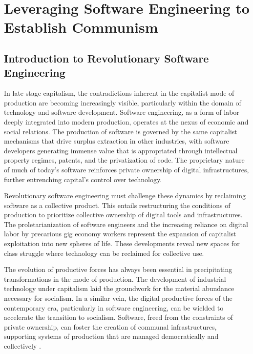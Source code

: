 \chapter{Leveraging Software Engineering to Establish Communism}
\begin{refsection}
    
\section{Introduction to Revolutionary Software Engineering}

In late-stage capitalism, the contradictions inherent in the capitalist mode of production are becoming increasingly visible, particularly within the domain of technology and software development. Software engineering, as a form of labor deeply integrated into modern production, operates at the nexus of economic and social relations. The production of software is governed by the same capitalist mechanisms that drive surplus extraction in other industries, with software developers generating immense value that is appropriated through intellectual property regimes, patents, and the privatization of code. The proprietary nature of much of today's software reinforces private ownership of digital infrastructures, further entrenching capital’s control over technology.

Revolutionary software engineering must challenge these dynamics by reclaiming software as a collective product. This entails restructuring the conditions of production to prioritize collective ownership of digital tools and infrastructures. The proletarianization of software engineers and the increasing reliance on digital labor by precarious gig economy workers represent the expansion of capitalist exploitation into new spheres of life. These developments reveal new spaces for class struggle where technology can be reclaimed for collective use.

The evolution of productive forces has always been essential in precipitating transformations in the mode of production. The development of industrial technology under capitalism laid the groundwork for the material abundance necessary for socialism. In a similar vein, the digital productive forces of the contemporary era, particularly in software engineering, can be wielded to accelerate the transition to socialism. Software, freed from the constraints of private ownership, can foster the creation of communal infrastructures, supporting systems of production that are managed democratically and collectively \cite[pp.~63]{marx-engels1959}.


\end{refsection}
